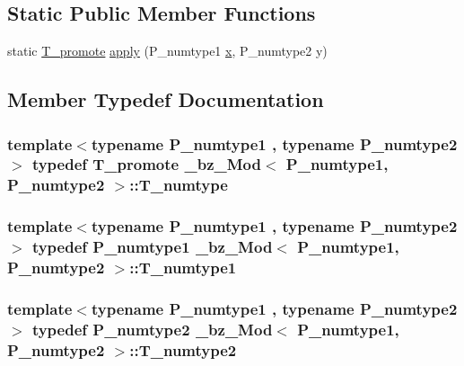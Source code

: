 \subsection*{Static Public Member Functions}
\begin{DoxyCompactItemize}
\item 
static \hyperlink{minmax_8h_aaa88a440c2f0d00798d5b1d42c79308d}{T\+\_\+promote} \hyperlink{class__bz__Mod_a98dcb099b74e8a23bad95c615f56453f}{apply} (P\+\_\+numtype1 \hyperlink{vecnorm1_8cc_ac73eed9e41ec09d58f112f06c2d6cb63}{x}, P\+\_\+numtype2 y)
\end{DoxyCompactItemize}


\subsection{Member Typedef Documentation}
\hypertarget{class__bz__Mod_a70ec6103ff43448ed49515b9e4444657}{}
\subsubsection[{T\+\_\+numtype}]{\setlength{\rightskip}{0pt plus 5cm}template$<$typename P\+\_\+numtype1 , typename P\+\_\+numtype2 $>$ typedef {\bf T\+\_\+promote} {\bf \+\_\+bz\+\_\+\+Mod}$<$ P\+\_\+numtype1, P\+\_\+numtype2 $>$\+::{\bf T\+\_\+numtype}}\label{class__bz__Mod_a70ec6103ff43448ed49515b9e4444657}
\hypertarget{class__bz__Mod_aaa07caed5d008d47b88d01898ab24fb4}{}
\subsubsection[{T\+\_\+numtype1}]{\setlength{\rightskip}{0pt plus 5cm}template$<$typename P\+\_\+numtype1 , typename P\+\_\+numtype2 $>$ typedef P\+\_\+numtype1 {\bf \+\_\+bz\+\_\+\+Mod}$<$ P\+\_\+numtype1, P\+\_\+numtype2 $>$\+::{\bf T\+\_\+numtype1}}\label{class__bz__Mod_aaa07caed5d008d47b88d01898ab24fb4}
\hypertarget{class__bz__Mod_a2861cf676a84bd9be4b3da33300b38ed}{}
\subsubsection[{T\+\_\+numtype2}]{\setlength{\rightskip}{0pt plus 5cm}template$<$typename P\+\_\+numtype1 , typename P\+\_\+numtype2 $>$ typedef P\+\_\+numtype2 {\bf \+\_\+bz\+\_\+\+Mod}$<$ P\+\_\+numtype1, P\+\_\+numtype2 $>$\+::{\bf T\+\_\+numtype2}}\label{class__bz__Mod_a2861cf676a84bd9be4b3da33300b38ed}


